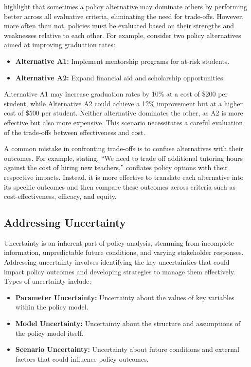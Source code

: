 \documentclass{article}
\theoremstyle{definition}
\theoremstyle{plain}
\begin{document}
\citet{Bardach2020} highlight that sometimes a policy alternative may dominate others by performing better across all evaluative criteria, eliminating the need for trade-offs. However, more often than not, policies must be evaluated based on their strengths and weaknesses relative to each other. For example, consider two policy alternatives aimed at improving graduation rates:

\begin{itemize}
    \item \textbf{Alternative A1:} Implement mentorship programs for at-risk students.
    \item \textbf{Alternative A2:} Expand financial aid and scholarship opportunities.
\end{itemize}

Alternative A1 may increase graduation rates by 10\% at a cost of \$200 per student, while Alternative A2 could achieve a 12\% improvement but at a higher cost of \$500 per student. Neither alternative dominates the other, as A2 is more effective but also more expensive. This scenario necessitates a careful evaluation of the trade-offs between effectiveness and cost.

A common mistake in confronting trade-offs is to confuse alternatives with their outcomes. For example, stating, “We need to trade off additional tutoring hours against the cost of hiring new teachers,” conflates policy options with their respective impacts. Instead, it is more effective to translate each alternative into its specific outcomes and then compare these outcomes across criteria such as cost-effectiveness, efficacy, and equity.

\subsection{Addressing Uncertainty}

Uncertainty is an inherent part of policy analysis, stemming from incomplete information, unpredictable future conditions, and varying stakeholder responses. Addressing uncertainty involves identifying the key uncertainties that could impact policy outcomes and developing strategies to manage them effectively. Types of uncertainty include:

\begin{itemize}
    \item \textbf{Parameter Uncertainty:} Uncertainty about the values of key variables within the policy model.
    \item \textbf{Model Uncertainty:} Uncertainty about the structure and assumptions of the policy model itself.
    \item \textbf{Scenario Uncertainty:} Uncertainty about future conditions and external factors that could influence policy outcomes.
\end{itemize}
\end{document}
